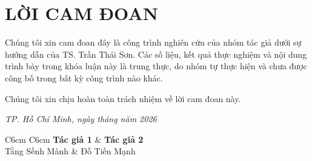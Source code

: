 \chapter*{LỜI CAM ĐOAN}
\label{reassurances}

Chúng tôi xin cam đoan đây là công trình nghiên cứu của nhóm tác giả dưới sự hướng dẫn của TS. Trần Thái Sơn. Các số liệu, kết quả thực nghiệm và nội dung trình bày trong khóa luận này là trung thực, do nhóm tự thực hiện và chưa được công bố trong bất kỳ công trình nào khác.

Chúng tôi xin chịu hoàn toàn trách nhiệm về lời cam đoan này.

\vspace{3cm}

\begin{flushright}
\textit{TP. Hồ Chí Minh, ngày \hspace{0.5em}\dotfill\hspace{0.5em} tháng \hspace{0.5em}\dotfill\hspace{0.5em} năm 2026}

\vspace{2cm}

\begin{tabular}{C{6cm} C{6cm}}
    \textbf{Tác giả 1} & \textbf{Tác giả 2} \\[2.5cm]
    Tằng Sềnh Mành & Đỗ Tiến Mạnh \\
\end{tabular}
\end{flushright}
